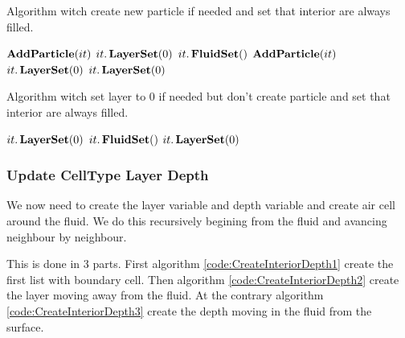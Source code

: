 \begin{algorithm}
\caption{Algorithm witch create new particle if needed and set that interior are always filled.}
\label{code:LayerInitialWithParticleDepth}
\begin{algorithmic}[1]
				\State $\mathop{\textbf{AddParticle}}(it)$
				\State $it.\mathop{\textbf{LayerSet}}(0)$
				\State $it.\mathop{\textbf{FluidSet}}()$
				\State $\mathop{\textbf{AddParticle}}(it)$
				\State $it.\mathop{\textbf{LayerSet}}(0)$
				\State $it.\mathop{\textbf{LayerSet}}(0)$
			\EndIf
\EndFor
\EndProcedure
\end{algorithmic}
\end{algorithm}

\begin{algorithm}
\caption{Algorithm witch set layer to 0 if needed but don't create particle and set that interior are always filled.}
\label{code:CreateInteriorDepth}
\begin{algorithmic}[1]
				\State $it.\mathop{\textbf{LayerSet}}(0)$
				\State $it.\mathop{\textbf{FluidSet}}()$
				\State $it.\mathop{\textbf{LayerSet}}(0)$
			\EndIf
\EndFor
\EndProcedure
\end{algorithmic}
\end{algorithm}

\subsubsection{Update CellType Layer Depth}

We now need to create the layer variable and depth variable and create air cell around the fluid.
We do this recursively begining from the fluid and avancing neighbour by neighbour.

This is done in 3 parts. First algorithm \ref{code:CreateInteriorDepth1} create the first list with boundary cell.
Then algorithm \ref{code:CreateInteriorDepth2} create the layer moving away from the fluid.
At the contrary algorithm \ref{code:CreateInteriorDepth3} create the depth moving in the fluid from the surface.

